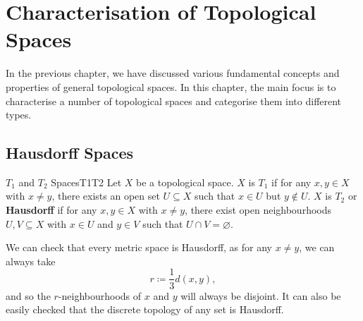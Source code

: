 \documentclass[math]{amznotes}
\theoremstyle{remark}
\begin{document}
\chapter{Characterisation of Topological Spaces}
In the previous chapter, we have discussed various fundamental concepts and properties of general topological spaces. In this chapter, the main focus is to characterise a number of topological spaces and categorise them into different types.
\section{Hausdorff Spaces}
\begin{dfnbox}{$T_1$ and $T_2$ Spaces}{T1T2}
    Let $X$ be a topological space. $X$ is {\color{red} \textbf{$T_1$}} if for any $x, y \in X$ with $x \neq y$, there exists an open set $U \subseteq X$ such that $x \in U$ but $y \notin U$. $X$ is {\color{red} \textbf{$T_2$}} or {\color{red} \textbf{Hausdorff}} if for any $x, y \in X$ with $x \neq y$, there exist open neighbourhoods $U, V \subseteq X$ with $x \in U$ and $y \in V$ such that $U \cap V = \varnothing$.
\end{dfnbox}
We can check that every metric space is Hausdorff, as for any $x \neq y$, we can always take 
\begin{equation*}
    r \coloneqq \frac{1}{3}d\left(x, y\right),
\end{equation*}
and so the $r$-neighbourhoods of $x$ and $y$ will always be disjoint. It can also be easily checked that the discrete topology of any set is Hausdorff. 
\end{document}
